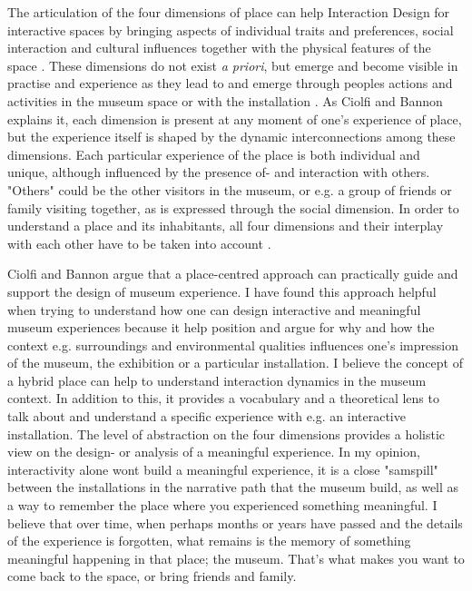 The articulation of the four dimensions of place can help Interaction Design for interactive spaces by bringing aspects of individual traits and preferences, social interaction and cultural influences together with the physical features of the space \autocite[p. 163]{hybridplace_ciolfi}. These dimensions do not exist \emph{a priori}, but emerge and become visible in practise and experience as they lead to and emerge through peoples actions and activities in the museum space or with the installation \autocite[p. 163]{hybridplace_ciolfi}. As Ciolfi and Bannon explains it, each dimension is present at any moment of one's experience of place, but the experience itself is shaped by the dynamic interconnections among these dimensions. Each particular experience of the place is both individual and unique, although influenced by the presence of- and interaction with others. "Others" could be the other visitors in the museum, or e.g. a group of friends or family visiting together, as is expressed through the social dimension. In order to understand a place and its inhabitants, all four dimensions and their interplay with each other have to be taken into account \autocite[p. 162]{hybridplace_ciolfi}.

\break

Ciolfi and Bannon argue that a place-centred approach can practically guide and support the design of museum experience. I have found this approach helpful when trying to understand how one can design interactive and meaningful museum experiences because it help position and argue for why and how the context e.g. surroundings and environmental qualities influences one's impression of the museum, the exhibition or a particular installation. I believe the concept of a hybrid place can help to understand interaction dynamics in the museum context. In addition to this, it provides a vocabulary and a theoretical lens to talk about and understand a specific experience with e.g. an interactive installation. The level of abstraction on the four dimensions provides a holistic view on the design- or analysis of a meaningful experience. In my opinion, interactivity alone wont build a meaningful experience, it is a close "samspill" between the installations in the narrative path that the museum build, as well as a way to remember the place where you experienced something meaningful. I believe that over time, when perhaps months or years have passed and the details of the experience is forgotten, what remains is the memory of something meaningful happening in that place; the museum. That's what makes you want to come back to the space, or bring friends and family.



